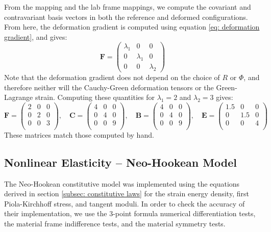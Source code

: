 \documentclass[]{spie}  %
\begin{document}
From the mapping and the lab frame mappings, we compute the covariant and contravariant basis vectors in both the reference and deformed configurations. From here, the deformation gradient is computed using equation \ref{eq: deformation gradient}, and gives:
\[
\bm{F} = 
\begin{pmatrix} 
\lambda_1 & 0 & 0 \\
0 & \lambda_1 & 0 \\
0 & 0 & \lambda_2
\end{pmatrix}
\]
Note that the deformation gradient does not depend on the choice of $R$ or $\Phi$, and therefore neither will the Cauchy-Green deformation tensors or the Green-Lagrange strain. Computing these quantities for $\lambda_1 = 2$ and $\lambda_2 = 3$ gives: 
\[
\bm{F} = 
\begin{pmatrix} 
2 & 0 & 0 \\
0 & 2 & 0 \\
0 & 0 & 3 \\
\end{pmatrix}
, \quad 
\bm{C} = 
\begin{pmatrix} 
4 & 0 & 0 \\
0 & 4 & 0 \\
0 & 0 & 9 \\
\end{pmatrix}
, \quad 
\bm{B} = 
\begin{pmatrix} 
4 & 0 & 0 \\
0 & 4 & 0 \\
0 & 0 & 9 \\
\end{pmatrix}
, \quad 
\bm{E} = 
\begin{pmatrix} 
1.5 & 0 & 0 \\
0 & 1.5 & 0 \\
0 & 0 & 4 \\
\end{pmatrix}
\]
These matrices match those computed by hand.

\subsection{Nonlinear Elasticity -- Neo-Hookean Model}
The Neo-Hookean constitutive model was implemented using the equations derived in section \ref{subsec: constitutive laws} for the strain energy density, first Piola-Kirchhoff stress, and tangent moduli. In order to check the accuracy of their implementation, we use the 3-point formula numerical differentiation tests, the material frame indifference tests, and the material symmetry tests. 
\end{document}
